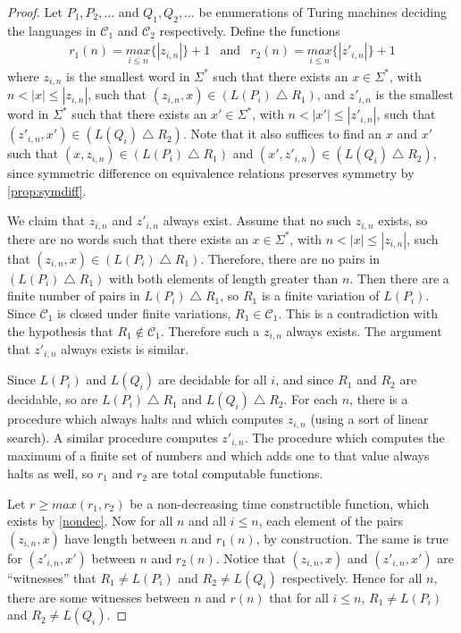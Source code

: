 \documentclass{article}
\theoremstyle{definition} \newtheorem{definition}[definition]{Definition}
\newcommand{\symdiff}{\bigtriangleup} %
\newcommand{\pair}[2]{\langle#1,#2\rangle} %
\begin{document}
\begin{proof} %
  Let $P_1, P_2, \ldots$ and $Q_1, Q_2, \ldots$ be enumerations of Turing machines deciding the languages in $\mathcal{C}_1$ and $\mathcal{C}_2$ respectively.
  Define the functions
  \begin{eqnarray*}
    r_1(n)=\underset{i\leq n}{max}\{|z_{i,n}|\}+1 & \text{and} &
    r_2(n)=\underset{i\leq n}{max}\{|z'_{i,n}|\}+1
  \end{eqnarray*}
  where $z_{i,n}$ is the smallest word in $\Sigma^*$ such that there exists an $x\in\Sigma^*$, with $n<|x|\leq|z_{i,n}|$, such that $(z_{i,n}, x)\in(L(P_i)\symdiff R_1)$, and $z'_{i,n}$ is the smallest word in $\Sigma^*$ such that there exists an $x'\in\Sigma^*$, with $n<|x'|\leq|z'_{i,n}|$, such that $(z'_{i,n}, x')\in(L(Q_i)\symdiff R_2)$.
  Note that it also suffices to find an $x$ and $x'$ such that $(x, z_{i,n})\in(L(P_i)\symdiff R_1)$ and $(x', z'_{i,n})\in(L(Q_i)\symdiff R_2)$, since symmetric difference on equivalence relations preserves symmetry by \autoref{prop:symdiff}.

  We claim that $z_{i,n}$ and $z'_{i,n}$ always exist.
  Assume that no such $z_{i,n}$ exists, so there are no words such that there exists an $x\in\Sigma^*$, with $n<|x|\leq|z_{i,n}|$, such that $(z_{i,n}, x)\in(L(P_i)\symdiff R_1)$.
  Therefore, there are no pairs in $(L(P_i)\symdiff R_1)$ with both elements of length greater than $n$.
  Then there are a finite number of pairs in $L(P_i)\symdiff R_1$, so $R_1$ is a finite variation of $L(P_i)$.
  Since $\mathcal{C}_1$ is closed under finite variations, $R_1\in\mathcal{C}_1$.
  This is a contradiction with the hypothesis that $R_1\notin\mathcal{C}_1$.
  Therefore such a $z_{i,n}$ always exists.
  The argument that $z'_{i,n}$ always exists is similar.

  Since $L(P_i)$ and $L(Q_i)$ are decidable for all $i$, and since $R_1$ and $R_2$ are decidable, so are $L(P_i)\symdiff R_1$ and $L(Q_i)\symdiff R_2$.
  For each $n$, there is a procedure which always halts and which computes $z_{i,n}$ (using a sort of linear search).
  A similar procedure computes $z'_{i,n}$.
  The procedure which computes the maximum of a finite set of numbers and which adds one to that value always halts as well, so $r_1$ and $r_2$ are total computable functions.

  Let $r\ge max(r_1,r_2)$ be a non-decreasing time constructible function, which exists by \autoref{nondec}.
  Now for all $n$ and all $i\leq n$, each element of the pairs $(z_{i,n},x)$ have length between $n$ and $r_1(n)$, by construction.
  The same is true for $(z'_{i,n}, x')$ between $n$ and $r_2(n)$.
  Notice that $(z_{i,n}, x)$ and $(z'_{i,n}, x')$ are ``witnesses'' that $R_1\neq L(P_i)$ and $R_2\neq L(Q_i)$ respectively.
  Hence for all $n$, there are some witnesses between $n$ and $r(n)$ that for all $i\leq n$, $R_1\neq L(P_i)$ and $R_2\neq L(Q_i)$.


\end{proof}
\end{document}
